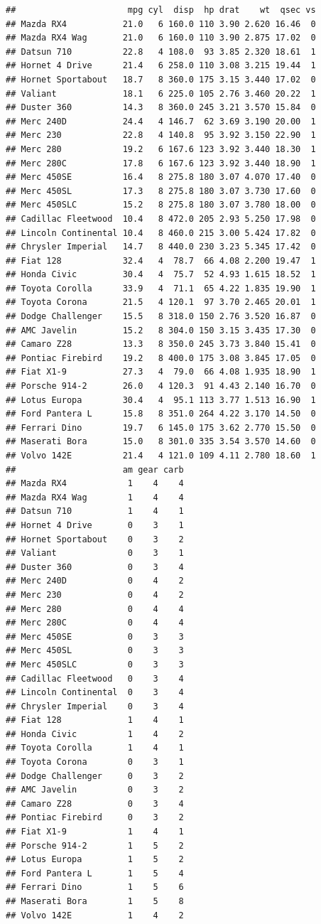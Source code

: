 \documentclass[
]{book}
\begin{document}
\begin{verbatim}
##                      mpg cyl  disp  hp drat    wt  qsec vs
## Mazda RX4           21.0   6 160.0 110 3.90 2.620 16.46  0
## Mazda RX4 Wag       21.0   6 160.0 110 3.90 2.875 17.02  0
## Datsun 710          22.8   4 108.0  93 3.85 2.320 18.61  1
## Hornet 4 Drive      21.4   6 258.0 110 3.08 3.215 19.44  1
## Hornet Sportabout   18.7   8 360.0 175 3.15 3.440 17.02  0
## Valiant             18.1   6 225.0 105 2.76 3.460 20.22  1
## Duster 360          14.3   8 360.0 245 3.21 3.570 15.84  0
## Merc 240D           24.4   4 146.7  62 3.69 3.190 20.00  1
## Merc 230            22.8   4 140.8  95 3.92 3.150 22.90  1
## Merc 280            19.2   6 167.6 123 3.92 3.440 18.30  1
## Merc 280C           17.8   6 167.6 123 3.92 3.440 18.90  1
## Merc 450SE          16.4   8 275.8 180 3.07 4.070 17.40  0
## Merc 450SL          17.3   8 275.8 180 3.07 3.730 17.60  0
## Merc 450SLC         15.2   8 275.8 180 3.07 3.780 18.00  0
## Cadillac Fleetwood  10.4   8 472.0 205 2.93 5.250 17.98  0
## Lincoln Continental 10.4   8 460.0 215 3.00 5.424 17.82  0
## Chrysler Imperial   14.7   8 440.0 230 3.23 5.345 17.42  0
## Fiat 128            32.4   4  78.7  66 4.08 2.200 19.47  1
## Honda Civic         30.4   4  75.7  52 4.93 1.615 18.52  1
## Toyota Corolla      33.9   4  71.1  65 4.22 1.835 19.90  1
## Toyota Corona       21.5   4 120.1  97 3.70 2.465 20.01  1
## Dodge Challenger    15.5   8 318.0 150 2.76 3.520 16.87  0
## AMC Javelin         15.2   8 304.0 150 3.15 3.435 17.30  0
## Camaro Z28          13.3   8 350.0 245 3.73 3.840 15.41  0
## Pontiac Firebird    19.2   8 400.0 175 3.08 3.845 17.05  0
## Fiat X1-9           27.3   4  79.0  66 4.08 1.935 18.90  1
## Porsche 914-2       26.0   4 120.3  91 4.43 2.140 16.70  0
## Lotus Europa        30.4   4  95.1 113 3.77 1.513 16.90  1
## Ford Pantera L      15.8   8 351.0 264 4.22 3.170 14.50  0
## Ferrari Dino        19.7   6 145.0 175 3.62 2.770 15.50  0
## Maserati Bora       15.0   8 301.0 335 3.54 3.570 14.60  0
## Volvo 142E          21.4   4 121.0 109 4.11 2.780 18.60  1
##                     am gear carb
## Mazda RX4            1    4    4
## Mazda RX4 Wag        1    4    4
## Datsun 710           1    4    1
## Hornet 4 Drive       0    3    1
## Hornet Sportabout    0    3    2
## Valiant              0    3    1
## Duster 360           0    3    4
## Merc 240D            0    4    2
## Merc 230             0    4    2
## Merc 280             0    4    4
## Merc 280C            0    4    4
## Merc 450SE           0    3    3
## Merc 450SL           0    3    3
## Merc 450SLC          0    3    3
## Cadillac Fleetwood   0    3    4
## Lincoln Continental  0    3    4
## Chrysler Imperial    0    3    4
## Fiat 128             1    4    1
## Honda Civic          1    4    2
## Toyota Corolla       1    4    1
## Toyota Corona        0    3    1
## Dodge Challenger     0    3    2
## AMC Javelin          0    3    2
## Camaro Z28           0    3    4
## Pontiac Firebird     0    3    2
## Fiat X1-9            1    4    1
## Porsche 914-2        1    5    2
## Lotus Europa         1    5    2
## Ford Pantera L       1    5    4
## Ferrari Dino         1    5    6
## Maserati Bora        1    5    8
## Volvo 142E           1    4    2
\end{verbatim}
\end{document}
